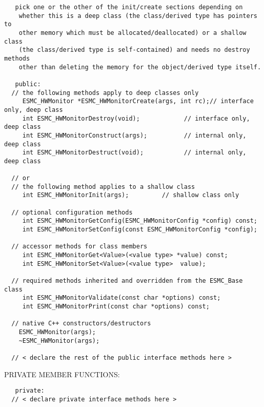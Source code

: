 \begin{verbatim}   pick one or the other of the init/create sections depending on
    whether this is a deep class (the class/derived type has pointers to
    other memory which must be allocated/deallocated) or a shallow class
    (the class/derived type is self-contained) and needs no destroy methods
    other than deleting the memory for the object/derived type itself.
 
   public:
  // the following methods apply to deep classes only
     ESMC_HWMonitor *ESMC_HWMonitorCreate(args, int rc);// interface only, deep class
     int ESMC_HWMonitorDestroy(void);            // interface only, deep class
     int ESMC_HWMonitorConstruct(args);          // internal only, deep class
     int ESMC_HWMonitorDestruct(void);           // internal only, deep class
 
  // or
  // the following method applies to a shallow class
     int ESMC_HWMonitorInit(args);         // shallow class only
 
  // optional configuration methods
     int ESMC_HWMonitorGetConfig(ESMC_HWMonitorConfig *config) const;
     int ESMC_HWMonitorSetConfig(const ESMC_HWMonitorConfig *config);
 
  // accessor methods for class members
     int ESMC_HWMonitorGet<Value>(<value type> *value) const;
     int ESMC_HWMonitorSet<Value>(<value type>  value);
     
  // required methods inherited and overridden from the ESMC_Base class
     int ESMC_HWMonitorValidate(const char *options) const;
     int ESMC_HWMonitorPrint(const char *options) const;
 
  // native C++ constructors/destructors
 	ESMC_HWMonitor(args);
 	~ESMC_HWMonitor(args);
   
  // < declare the rest of the public interface methods here >
   \end{verbatim}{\sf PRIVATE MEMBER FUNCTIONS:}
\begin{verbatim}   private: 
  // < declare private interface methods here >\end{verbatim}

